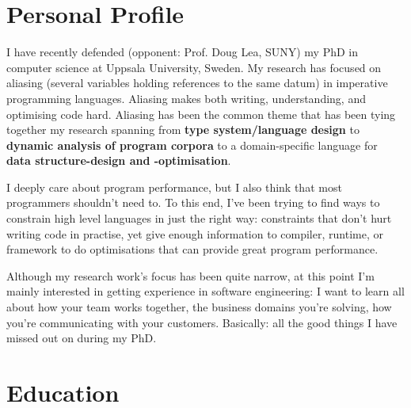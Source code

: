 \documentclass[10pt]{article} %
\begin{document}
\section{Personal Profile}

{I have recently defended (opponent: Prof. Doug Lea, SUNY) my PhD in computer
  science at Uppsala University, Sweden. My research has focused on aliasing
  (several variables holding references to the same datum) in imperative
  programming languages. Aliasing makes both writing, understanding, and
  optimising code hard. Aliasing has been the common theme that has been tying
  together my research spanning from \textbf{type system/language design} to
  \textbf{dynamic analysis of program corpora} to a domain-specific language for
  \textbf{data structure-design and -optimisation}.

  I deeply care about program performance, but I also think that most
  programmers shouldn't need to. To this end, I've been trying to find ways to
  constrain high level languages in just the right way: constraints that don't
  hurt writing code in practise, yet give enough information to compiler,
  runtime, or framework to do optimisations that can provide great program
  performance.

  Although my research work's focus has been quite narrow, at this point I'm
  mainly interested in getting experience in software engineering: I want to
  learn all about how your team works together, the business domains you're
  solving, how you're communicating with your customers. Basically: all the good
  things I have missed out on during my PhD. }


\newcommand{\project}[1]{\emph{#1}}
\newcommand{\ddomains}{\project{Disjointness Domains}}
\newcommand{\spencer}{\project{Spencer}}
\newcommand{\cflat}{\project{$C\flat$}}
\newcommand{\encore}{\project{Encore}}

\section{Education}
\end{document}
